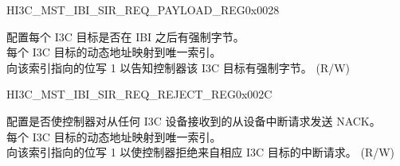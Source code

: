 \begin{register}{H}{I3C\_MST\_IBI\_SIR\_REQ\_PAYLOAD\_REG}{0x0028}\label{regdesc:I3CMSTIBISIRREQPAYLOADREG}
%
\regnewline%
\begin{regdesc}\begin{reglist}
\label{fielddesc:I3CMSTREGSIRREQPAYLOAD}\item [I3C\_MST\_REG\_SIR\_REQ\_PAYLOAD] 配置每个 I3C 目标是否在 IBI 之后有强制字节。\\
每个 I3C 目标的动态地址映射到唯一索引。\\
向该索引指向的位写 1 以告知控制器该 I3C 目标有强制字节。 (R/W)
\end{reglist}\end{regdesc}
\end{register}


\begin{register}{H}{I3C\_MST\_IBI\_SIR\_REQ\_REJECT\_REG}{0x002C}\label{regdesc:I3CMSTIBISIRREQREJECTREG}
%
\regnewline%
\begin{regdesc}\begin{reglist}
\label{fielddesc:I3CMSTREGSIRREQREJECT}\item [I3C\_MST\_REG\_SIR\_REQ\_REJECT] 配置是否使控制器对从任何 I3C 设备接收到的从设备中断请求发送 NACK。\\
每个 I3C 目标的动态地址映射到唯一索引。\\
向该索引指向的位写 1 以使控制器拒绝来自相应 I3C 目标的中断请求。 (R/W)
\end{reglist}\end{regdesc}
\end{register}


